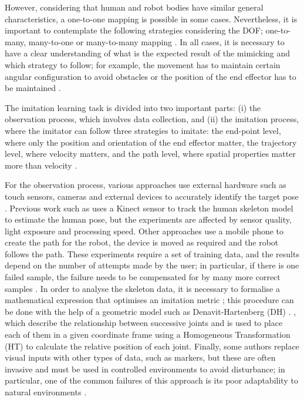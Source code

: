 \documentclass[thesis]{mas_proposal}
\begin{document}
    However, considering that human and robot bodies have similar general characteristics, a one-to-one mapping is possible in some cases. Nevertheless, it is important to contemplate the following strategies considering the DOF; one-to-many, many-to-one or many-to-many mapping \cite{Alissandrakis2007}. In all cases, it is necessary to have a clear understanding of what is the expected result of the mimicking and which strategy to follow; for example, the movement has to maintain certain angular configuration to avoid obstacles or the position of the end effector has to be maintained \cite{Bandera2010, Shin2001}.
    
    The imitation learning task is divided into two important parts: (i) the observation process, which involves data collection, and (ii) the imitation process, where the imitator can follow three strategies to imitate: the end-point level, where only the position and orientation of the end effector matter, the trajectory level, where velocity matters, and the path level, where spatial properties matter more than velocity \cite{Alissandrakis2002}.
    
    For the observation process, various approaches use external hardware such as touch sensors, cameras and external devices to accurately identify the target pose \cite{Hua2021}. Previous work such as \cite{Itauma2012, Liu2015} uses a Kinect sensor to track the human skeleton model to estimate the human pose, but the experiments are affected by sensor quality, light exposure and processing speed. Other approaches use a mobile phone to create the path for the robot, the device is moved as required and the robot follows the path. These experiments require a set of training data, and the results depend on the number of attempts made by the user; in particular, if there is one failed sample, the failure needs to be compensated for by many more correct samples \cite{Mandlekar2018}. In order to analyse the skeleton data, it is necessary to formalise a mathematical expression that optimises an imitation metric \cite{Billard2004}; this procedure can be done with the help of a geometric model such as Denavit-Hartenberg (DH) \cite{Fadli2018}. \cite{Assad2020, VanPerre2015}, which describe the relationship between successive joints and is used to place each of them in a given coordinate frame using a Homogeneous Transformation (HT) to calculate the relative position of each joint. Finally, some authors replace visual inputs with other types of data, such as markers, but these are often invasive and must be used in controlled environments to avoid disturbance; in particular, one of the common failures of this approach is its poor adaptability to natural environments \cite{Mohammad2009, Dillmann2004}.
    
\end{document}
